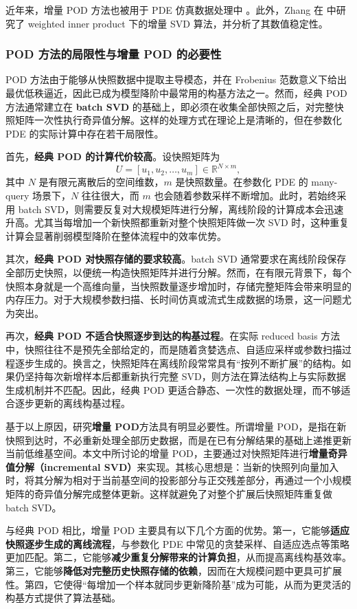 近年来，增量 POD 方法也被用于 PDE 仿真数据处理中 \cite{fareed2018,fareed2020}。此外，Zhang 在 \cite{zhang2022} 中研究了 weighted inner product 下的增量 SVD 算法，并分析了其数值稳定性。

\subsubsection{POD 方法的局限性与增量 POD 的必要性}
POD 方法由于能够从快照数据中提取主导模态，并在 Frobenius 范数意义下给出最优低秩逼近，因此已成为模型降阶中最常用的构基方法之一。然而，经典 POD 方法通常建立在 \textbf{batch SVD} 的基础上，即必须在收集全部快照之后，对完整快照矩阵一次性执行奇异值分解。这样的处理方式在理论上是清晰的，但在参数化 PDE 的实际计算中存在若干局限性。

首先，\textbf{经典 POD 的计算代价较高}。设快照矩阵为
\[
U=[u_1,u_2,\dots,u_m]\in\mathbb R^{N\times m},
\]
其中 $N$ 是有限元离散后的空间维数，$m$ 是快照数量。在参数化 PDE 的 many-query 场景下，$N$ 往往很大，而 $m$ 也会随着参数采样不断增加。此时，若始终采用 batch SVD，则需要反复对大规模矩阵进行分解，离线阶段的计算成本会迅速升高。尤其当每增加一个新快照都重新对整个快照矩阵做一次 SVD 时，这种重复计算会显著削弱模型降阶在整体流程中的效率优势。

其次，\textbf{经典 POD 对快照存储的要求较高}。batch SVD 通常要求在离线阶段保存全部历史快照，以便统一构造快照矩阵并进行分解。然而，在有限元背景下，每个快照本身就是一个高维向量，当快照数量逐步增加时，存储完整矩阵会带来明显的内存压力。对于大规模参数扫描、长时间仿真或流式生成数据的场景，这一问题尤为突出。

再次，\textbf{经典 POD 不适合快照逐步到达的构基过程}。在实际 reduced basis 方法中，快照往往不是预先全部给定的，而是随着贪婪选点、自适应采样或参数扫描过程逐步生成的。换言之，快照矩阵在离线阶段常常具有“按列不断扩展”的结构。如果仍坚持每次新增样本后都重新执行完整 SVD，则方法在算法结构上与实际数据生成机制并不匹配。因此，经典 POD 更适合静态、一次性的数据处理，而不够适合逐步更新的离线构基过程。

基于以上原因，研究\textbf{增量 POD}方法具有明显必要性。所谓增量 POD，是指在新快照到达时，不必重新处理全部历史数据，而是在已有分解结果的基础上递推更新当前低维基空间。本文中所讨论的增量 POD，主要通过对快照矩阵进行\textbf{增量奇异值分解（incremental SVD）}来实现。其核心思想是：当新的快照列向量加入时，将其分解为相对于当前基空间的投影部分与正交残差部分，再通过一个小规模矩阵的奇异值分解完成整体更新。这样就避免了对整个扩展后快照矩阵重复做 batch SVD。

与经典 POD 相比，增量 POD 主要具有以下几个方面的优势。第一，它能够\textbf{适应快照逐步生成的离线流程}，与参数化 PDE 中常见的贪婪采样、自适应选点等策略更加匹配。第二，它能够\textbf{减少重复分解带来的计算负担}，从而提高离线构基效率。第三，它能够\textbf{降低对完整历史快照存储的依赖}，因而在大规模问题中更具可扩展性。第四，它使得“每增加一个样本就同步更新降阶基”成为可能，从而为更灵活的构基方式提供了算法基础。

